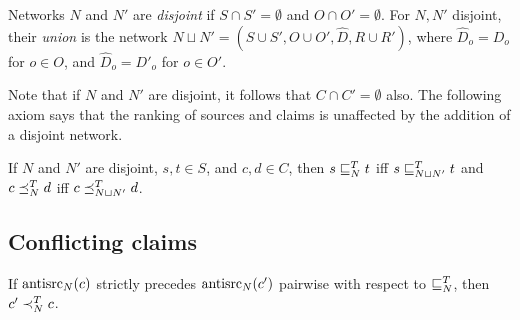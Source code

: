 \begin{definition}
    Networks $N$ and $N'$ are \emph{disjoint} if $S \cap S' = \emptyset$ and $O
    \cap O' = \emptyset$. For $N, N'$ disjoint, their \emph{union} is the
    network $N \sqcup N' = (S \cup S', O \cup O', \hat{D}, R \cup R')$, where
    $\hat{D}_o = D_o$ for $o \in O$, and $\hat{D}_o = D'_o$ for $o \in O'$.
\end{definition}

Note that if $N$ and $N'$ are disjoint, it follows that $C \cap C' = \emptyset$
also.
%
The following axiom says that the ranking of sources and claims is unaffected
by the addition of a disjoint network.

\begin{axiom}[\disjointindependence{}]
    If $N$ and $N'$ are disjoint, $s, t \in S$, and $c, d \in C$, then
    $s \sqsubseteq_N^T t$ iff $s \sqsubseteq_{N \sqcup N'}^T t$ and $c \preceq_N^T d$ iff $c
    \preceq_{N \sqcup N'}^T d$.
\end{axiom}


\subsection{Conflicting claims}
\label{td_new_sec_conflicting_claims}



\begin{axiom}[\anticoherence{}]
    If $\operatorname{antisrc}_N(c)$ strictly precedes $\operatorname{antisrc}_N(c')$ pairwise with respect
    to $\sqsubseteq_N^T$, then $c' \prec_N^T c$.
\end{axiom}


